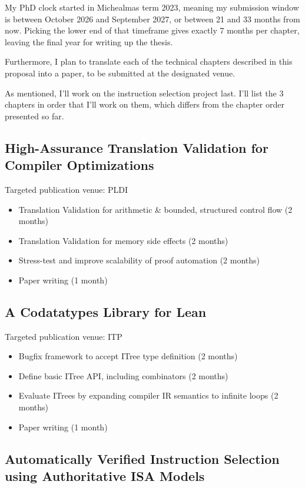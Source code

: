 \documentclass[a4paper]{scrartcl}
\begin{document}
My PhD clock started in Michealmas term 2023, meaning my submission
window is between October 2026 and September 2027, or between 21 and 33
months from now. Picking the lower end of that timeframe gives exactly 7
months per chapter, leaving the final year for writing up the thesis.

Furthermore, I plan to translate each of the technical chapters described in this proposal into a paper, to be submitted at the designated venue. 

As mentioned, I'll work on the instruction selection project last.
I'll list the 3 chapters in order that I'll work on them, which differs from the
chapter order presented so far.

\subsection*{High-Assurance Translation Validation for Compiler Optimizations}
Targeted publication venue: PLDI

\begin{itemize}
\item
  Translation Validation for arithmetic \& bounded, structured control
  flow (2 months)
\item
  Translation Validation for memory side effects (2 months)
\item
  Stress-test and improve scalability of proof automation (2 months)
\item
  Paper writing (1 month)
\end{itemize}

\subsection*{A Codatatypes Library for Lean}\label{a-codatatypes-library-for-lean-1}

Targeted publication venue: ITP

\begin{itemize}
\item
  Bugfix framework to accept ITree type definition (2 months)
\item
  Define basic ITree API, including combinators (2 months)
\item
  Evaluate ITrees by expanding compiler IR semantics to infinite loops
  (2 months)
\item
  Paper writing (1 month)
\end{itemize}

\subsection*{Automatically Verified Instruction Selection using
Authoritative ISA Models}\label{scaling-high-assurance-translation-validation-to-authoritative-isa-models-1}
\end{document}
